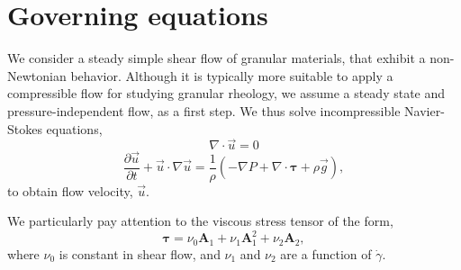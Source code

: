 \section{Governing equations}
We consider a steady simple shear flow of granular materials, that exhibit a non-Newtonian behavior. Although it is typically more suitable to apply a compressible flow for studying granular rheology, we assume a steady state and pressure-independent flow, as a first step. 
We thus solve incompressible Navier-Stokes equations,
\begin{equation}
  \nabla \cdot \vec{u} = 0 
  \label{eq_div_free} 
\end{equation}
\begin{equation}
     \frac{\partial \vec{u}}{\partial t} + \vec{u}\cdot \nabla \vec{u}
= \frac{1}{\rho}
\left(
- \nabla P 
    + \nabla \cdot   \bm{\tau} 
    +  \rho  \vec{g} 
    \right),
  \label{eq_NS_ch4}
  \end{equation}
to obtain flow velocity, $\vec{u}$.

We particularly pay attention to the viscous stress tensor of the form,
\begin{equation}
   \boldsymbol{\tau} = 
    \nu_0  \bm{A}_1 +  \nu_1  \bm{A}_1^2 + \nu_2 \bm{A}_2,
   \label{eq_CN_tau}
\end{equation}
where $\nu_0$ is constant in shear flow, and $\nu_1$ and $\nu_2$ are a function of $\dot{\gamma}$.
